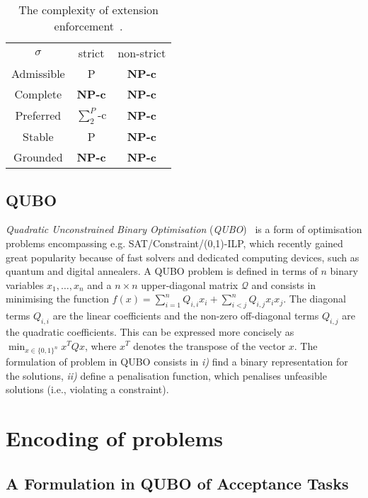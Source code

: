 \documentclass[conference]{IEEEtran}
\begin{document}
\begin{table}[t]
	\centering
	\footnotesize
	\begin{tabular}{ccc}
		$\sigma$ &  strict & non-strict  \\
		Admissible & P  & \bf{NP-c}   \\
		Complete & \bf{NP-c} &  \bf{NP-c}  \\
		Preferred & $\sum^{P}_{2}$-c  &  \bf{NP-c}  \\
		Stable &  P & \bf{NP-c}  \\
		Grounded & \bf{NP-c} & \bf{NP-c}
	\end{tabular}
	\caption{The complexity of extension enforcement~\cite{extenf}.}
	\label{sec:complexity2}
	\vspace{-0.5cm}
\end{table}


\subsection{QUBO}\label{sect:qubo}
\emph{Quadratic Unconstrained Binary Optimisation} (\emph{QUBO})~\cite{glover} is a
form of optimisation problems encompassing e.g. SAT/Constraint/(0,1)-ILP, which  recently gained great popularity because of fast solvers and dedicated computing devices, such as
quantum and digital annealers. 
A QUBO problem is defined in terms of $n$ binary variables $x_1,\dots,x_n$
and a $n\times n$ upper-diagonal matrix $\mathcal{Q}$ and consists in 
minimising the function $f(x) = \sum_{i=1}^n Q_{i,i} x_i + \sum_{i < j}^n Q_{i,j} x_i x_j$.
The diagonal terms $Q_{i,i}$ are the linear coefficients and the non-zero off-diagonal terms $Q_{i,j}$
are the quadratic coefficients. This can be expressed more concisely as $\min_{x \in \{0,1\}^n} x^T Q x$, where $x^T$ denotes the transpose of the vector $x$. The formulation of problem in QUBO
consists in  \emph{i)}  find a binary representation for the solutions, \emph{ii)}  define a penalisation function, which penalises unfeasible solutions (i.e., violating a constraint).

\section{Encoding of problems}\label{sect:encoding}

\subsection{A Formulation in QUBO of  Acceptance Tasks}
\end{document}
